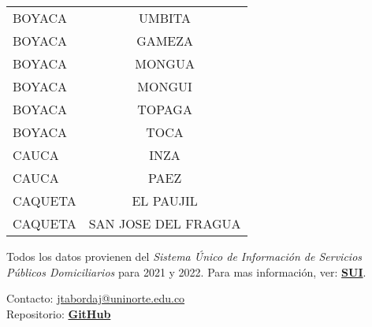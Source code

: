 \documentclass[12pt,a4paper]{article}
\begin{document}
\begin{longtable}{@{}lc@{}}
		BOYACA             & UMBITA                \\
		BOYACA             & GAMEZA                \\
		BOYACA             & MONGUA                \\
		BOYACA             & MONGUI                \\
		BOYACA             & TOPAGA                \\
		BOYACA             & TOCA                  \\
		CAUCA              & INZA                  \\
		CAUCA              & PAEZ                  \\
		CAQUETA            & EL PAUJIL             \\
		CAQUETA            & SAN JOSE DEL FRAGUA   \\ \bottomrule
\end{longtable}

Todos los datos provienen del \textit{Sistema Único de Información de Servicios Públicos Domiciliarios} para 2021 y 2022. Para mas información, ver: \textbf{\href{http://sui.superservicios.gov.co/Reportes-del-sector/Energia/Reportes-comerciales/Consolidado-Energia-por-Empresa-Departamento-y-Municipio}{SUI}}.

\vfill

\noindent Contacto: \href{mailto:jtabordaj@uninorte.edu.co}{jtabordaj@uninorte.edu.co} \\
Repositorio: \textbf{\href{https://github.com/jtabordaj/research_eslatina}{GitHub}}
\end{document}
